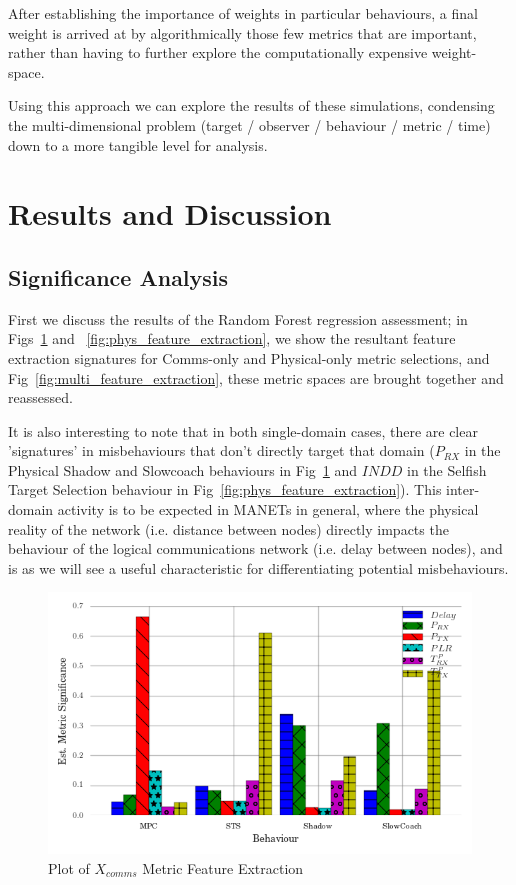 \documentclass{aamas2016}
\begin{document}
After establishing the importance of weights in particular behaviours, a final weight is arrived at by algorithmically those few metrics that are important, rather than having to further explore the computationally expensive weight-space.

Using this approach we can explore the results of these simulations, condensing the multi-dimensional problem (target / observer / behaviour / metric / time) down to a more tangible level for analysis.

\section{Results and Discussion}

\subsection{Significance Analysis}

First we discuss the results of the Random Forest regression assessment; in Figs~\ref{fig:comms_feature_extraction} and ~\ref{fig:phys_feature_extraction}, we show the resultant feature extraction signatures for Comms-only and Physical-only metric selections, and Fig~\ref{fig:multi_feature_extraction}, these metric spaces are brought together and reassessed.

It is also interesting to note that in both single-domain cases, there are clear 'signatures' in misbehaviours that don't directly target that domain ($P_{RX}$ in the Physical Shadow and Slowcoach behaviours in Fig~\ref{fig:comms_feature_extraction} and $INDD$ in the Selfish Target Selection behaviour in Fig~\ref{fig:phys_feature_extraction}).
This inter-domain activity is to be expected in MANETs in general, where the physical reality of the network (i.e. distance between nodes) directly impacts the behaviour of the logical communications network (i.e. delay between nodes), and is as we will see a useful characteristic for differentiating potential misbehaviours.



\begin{figure}[h!]
	\centering
  \includegraphics[width=\linewidth]{comms_metric_trust_relevance}
	\caption{Plot of $X_{comms}$ Metric Feature Extraction}
	\label{fig:comms_feature_extraction}
\end{figure}
\end{document}
